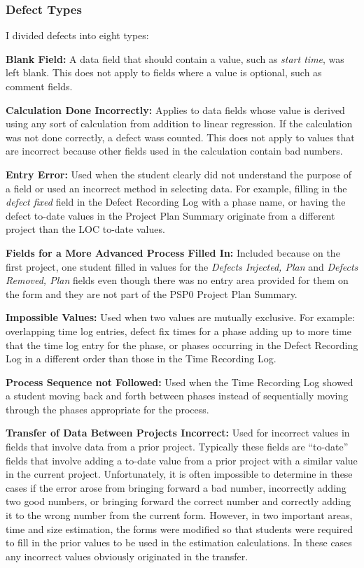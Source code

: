 \subsubsection{Defect Types}
I divided defects into eight types:\newline

{\bf Blank Field:} 
A data field that should contain a value, such as {\it start time},
was left blank.  This does not apply to fields where a value is 
optional, such as comment fields.

{\bf Calculation Done Incorrectly:}
Applies to data fields whose value is derived using any
sort of calculation from addition to linear regression.  If the calculation
was not done correctly, a defect wass counted.  This does not apply to
values that are incorrect because other fields used in the calculation
contain bad numbers.

{\bf Entry Error:}
Used when the student clearly did not understand the 
purpose of a field or used an incorrect method in selecting data.  For
example, filling in the {\it defect fixed} field in the Defect Recording
Log with a phase name, or having the defect to-date values in the 
Project Plan Summary originate from a different project than the LOC
to-date values.

{\bf Fields for a More Advanced Process Filled In:}
Included because on the first project, one student filled in values for the
{\it Defects Injected, Plan} and {\it Defects Removed, Plan} fields even
though there was no entry area provided for them on the form and
they are not part of the PSP0 Project Plan Summary. 

{\bf Impossible Values:} Used when two values are mutually exclusive.  For
example: overlapping time log entries, defect fix times for a phase adding
up to more time that the time log entry for the phase, or phases occurring
in the Defect Recording Log in a different order than those in the Time
Recording Log. 

{\bf Process Sequence not Followed:} Used when the Time Recording Log showed a student
moving back and forth between phases instead of sequentially moving through
the phases appropriate for the process.

{\bf Transfer of Data Between Projects Incorrect:}
Used for incorrect values in fields that involve data from a prior
project.  Typically these fields are ``to-date'' fields that involve adding a
to-date value from a prior project with a similar value in the current project.
Unfortunately, it is often impossible to determine in these cases if the
error arose from bringing forward a bad number, incorrectly adding two good
numbers, or bringing forward the correct number and correctly adding it
to the wrong number from the current form.  However, in two important
areas, time and size estimation, the forms were modified so that students
were required to fill in the prior values to be used in the estimation
calculations. In these cases any incorrect values obviously originated in
the transfer.

